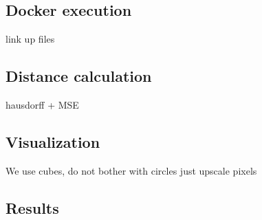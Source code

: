 \subsection{Docker execution}
link up files

\subsection{Distance calculation}
hausdorff + MSE

\subsection{Visualization}
We use cubes, do not bother with circles just upscale pixels

\subsection{Results}

